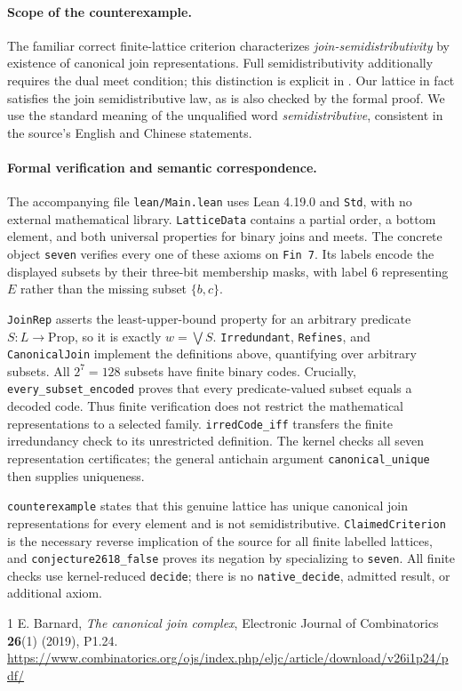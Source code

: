 \documentclass[11pt]{article}
\begin{document}
\paragraph{Scope of the counterexample.}
The familiar correct finite-lattice criterion characterizes
\emph{join-semidistributivity} by existence of canonical join
representations. Full semidistributivity additionally requires the dual
meet condition; this distinction is explicit in \cite{Barnard}.
Our lattice in fact satisfies the join semidistributive law, as is also
checked by the formal proof. We use the standard meaning of the
unqualified word \emph{semidistributive}, consistent in the source's
English and Chinese statements.

\paragraph{Formal verification and semantic correspondence.}
The accompanying file \texttt{lean/Main.lean} uses Lean 4.19.0 and
\texttt{Std}, with no external mathematical library.
\texttt{LatticeData} contains a partial order, a bottom element, and
both universal properties for binary joins and meets. The concrete
object \texttt{seven} verifies every one of these axioms on
\texttt{Fin 7}. Its labels encode the displayed subsets by their
three-bit membership masks, with label $6$ representing $E$ rather than
the missing subset $\{b,c\}$.

\texttt{JoinRep} asserts the least-upper-bound property for an
arbitrary predicate $S:L\to\mathrm{Prop}$, so it is exactly
$w=\bigvee S$. \texttt{Irredundant}, \texttt{Refines}, and
\texttt{CanonicalJoin} implement the definitions above, quantifying over
arbitrary subsets.
All $2^7=128$ subsets have finite binary codes.
Crucially, \texttt{every\_subset\_encoded} proves that every
predicate-valued subset equals a decoded code.
Thus finite verification does not restrict the mathematical
representations to a selected family.
\texttt{irredCode\_iff} transfers the finite irredundancy check to its
unrestricted definition.
The kernel checks all seven representation certificates; the general
antichain argument \texttt{canonical\_unique} then supplies uniqueness.

\texttt{counterexample} states that this genuine lattice has unique
canonical join representations for every element and is not
semidistributive.
\texttt{ClaimedCriterion} is the necessary reverse implication of the
source for all finite labelled lattices, and
\texttt{conjecture2618\_false} proves its negation by specializing to
\texttt{seven}.
All finite checks use kernel-reduced \texttt{decide}; there is no
\texttt{native\_decide}, admitted result, or additional axiom.

\begin{thebibliography}{1}
E. Barnard, \emph{The canonical join complex},
Electronic Journal of Combinatorics \textbf{26}(1) (2019), P1.24.
\url{https://www.combinatorics.org/ojs/index.php/eljc/article/download/v26i1p24/pdf/}
\end{thebibliography}
\end{document}
